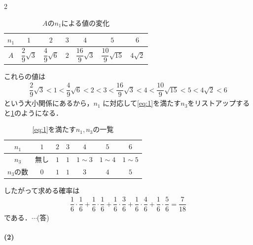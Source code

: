 \documentclass[../../main.tex]{subfiles}
\begin{document}
\begin{multicols}{2}
  \begin{table}[H]
    \centering
    \caption{$A$の$n_1$による値の変化}
    \begin{tabular}{|c||c|c|c|c|c|c|}
      \hline
      $n_1$ & $1$                   & $2$                   & $3$ & $4$                    & $5$                     & $6$         \\
      \hline
      $A$   & $\dfrac{2}{9}\sqrt{3}$ & $\dfrac{4}{9}\sqrt{6}$ & $2$ & $\dfrac{16}{9}\sqrt{3}$ & $\dfrac{10}{9}\sqrt{15}$ & $4\sqrt{2}$ \\
      \hline
    \end{tabular}
  \end{table}

  これらの値は
  \begin{align}
    \dfrac{2}{9}\sqrt{3} < 1 < \dfrac{4}{9}\sqrt{6} < 2 < 3 < \dfrac{16}{9}\sqrt{3} < 4 < \dfrac{10}{9}\sqrt{15} < 5 < 4\sqrt{2} < 6
  \end{align}
  という大小関係にあるから，$n_1$ に対応して\cref{eq:1}を満たす$n_3$をリストアップすると\cref{2007-1:table:2}のようになる．

  \begin{table}[H]
    \centering
    \caption{\cref{eq:1}を満たす$n_1,n_3$の一覧}
    \label{2007-1:table:2}
    \begin{tabular}{|c||c|c|c|c|c|c|}
      \hline
      $n_1$   & $1$ & $2$ & $3$ & $4$        & $5$        & $6$        \\
      \hline
      $n_3$   & 無し  & $1$ & $1$ & $1 \sim 3$ & $1 \sim 4$ & $1 \sim 5$ \\
      \hline
      $n_3$の数 & $0$ & $1$ & $1$ & $3$        & $4$        & $5$        \\
      \hline
    \end{tabular}
  \end{table}

  したがって求める確率は
  \begin{align}
    \dfrac{1}{6}\cdot\dfrac{1}{6}
    + \dfrac{1}{6}\cdot\dfrac{1}{6}
    + \dfrac{1}{6}\cdot\dfrac{3}{6}
    + \dfrac{1}{6}\cdot\dfrac{4}{6}
    + \dfrac{1}{6}\cdot\dfrac{5}{6} = \dfrac{7}{18}
  \end{align}
  である．$\cdots$(答)

  \paragraph{(2)}


\end{multicols}
\end{document}

